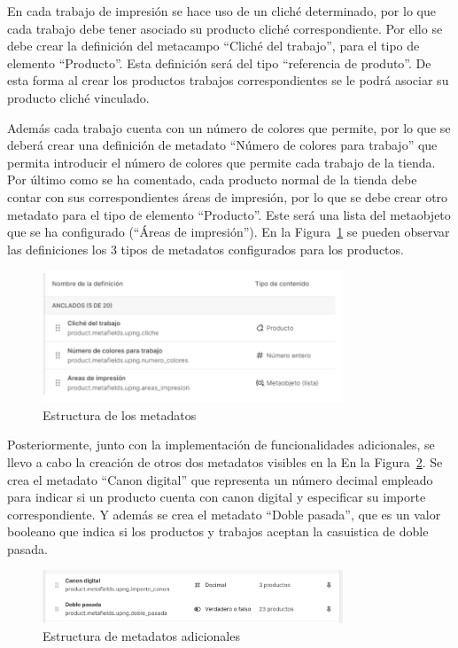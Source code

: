 \documentclass[12pt]{article}
\begin{document}
En cada trabajo de impresión se hace uso de un cliché determinado, por lo que cada trabajo debe tener asociado su producto cliché correspondiente. Por ello se debe 
crear la definición del metacampo ``Cliché del trabajo'', para el tipo de elemento ``Producto''. Esta definición será del tipo ``referencia de produto''. De esta forma al crear los productos trabajos correspondientes se le podrá asociar su producto cliché vinculado.

Además cada trabajo cuenta con un número de colores que permite, por lo que se deberá crear una definición de metadato ``Número de colores para trabajo'' que permita
introducir el número de colores que permite cada trabajo de la tienda. Por último como se ha comentado, cada producto normal de la tienda debe contar con sus correspondientes áreas de impresión, por lo que se debe crear otro metadato para el tipo de elemento ``Producto''. Este será una 
lista del metaobjeto que se ha configurado (``Áreas de impresión''). En la Figura~\ref{fig:metadatos} se pueden observar las definiciones los 3 tipos de metadatos configurados para los productos.

\begin{figure}[ht]
    \centering
    \includegraphics[width=0.8\textwidth]{imagenesUS2/creacionMetafields.png}
    \caption{\label{fig:metadatos}Estructura de los metadatos}
    \vspace{\fill}
\end{figure}

Posteriormente, junto con la implementación de funcionalidades adicionales, se llevo a cabo la creación de otros dos metadatos visibles en la En la Figura~\ref{fig:metafieldsAdicionales}. 
Se crea el metadato  ``Canon digital'' que representa un número decimal empleado para indicar si un producto cuenta con canon digital y especificar su importe correspondiente. Y además
se crea el metadato ``Doble pasada'', que es un valor booleano que indica si los productos y trabajos aceptan la casuistica de doble pasada.

\begin{figure}[ht]
    \centering
    \includegraphics[width=0.8\textwidth]{imagenesUS2/metafieldsAdicionales.png}
    \caption{\label{fig:metafieldsAdicionales}Estructura de metadatos adicionales}
    \vspace{\fill}
\end{figure}
\end{document}
